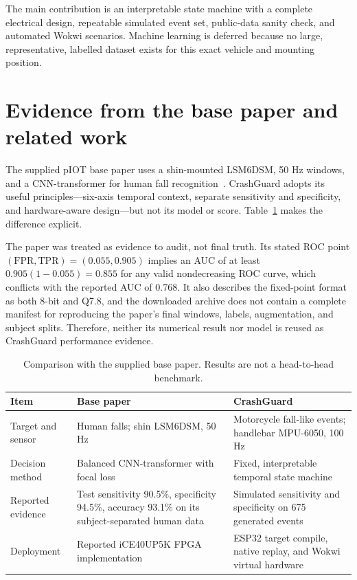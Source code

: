 \documentclass[12pt,a4paper]{article}
\begin{document}
The main contribution is an interpretable state machine with a complete
electrical design, repeatable simulated event set, public-data sanity check,
and automated Wokwi scenarios. Machine learning is deferred because no large,
representative, labelled dataset exists for this exact vehicle and mounting
position.

\section{Evidence from the base paper and related work}

The supplied pIOT base paper uses a shin-mounted LSM6DSM, 50 Hz windows, and a
CNN-transformer for human fall recognition~\cite{tian2026transformer}.
CrashGuard adopts its useful principles---six-axis temporal context, separate
sensitivity and specificity, and hardware-aware design---but not its model or
score. Table~\ref{tab:basecompare} makes the difference explicit.

The paper was treated as evidence to audit, not final truth. Its stated ROC
point $(\mathrm{FPR},\mathrm{TPR})=(0.055,0.905)$ implies an AUC of at least
$0.905(1-0.055)=0.855$ for any valid nondecreasing ROC curve, which conflicts
with the reported AUC of 0.768. It also describes the fixed-point format as
both 8-bit and Q7.8, and the downloaded archive does not contain a complete
manifest for reproducing the paper's final windows, labels, augmentation, and
subject splits. Therefore, neither its numerical result nor model is reused
as CrashGuard performance evidence.

\begin{table}[H]
\centering
\footnotesize
\caption{Comparison with the supplied base paper. Results are not a head-to-head benchmark.}
\label{tab:basecompare}
\begin{tabularx}{\textwidth}{@{}p{}XX@{}}
\toprule
Item & Base paper & CrashGuard \\
\midrule
Target and sensor & Human falls; shin LSM6DSM, 50 Hz & Motorcycle fall-like
events; handlebar MPU-6050, 100 Hz \\
Decision method & Balanced CNN-transformer with focal loss & Fixed,
interpretable temporal state machine \\
Reported evidence & Test sensitivity 90.5\%, specificity 94.5\%, accuracy
93.1\% on its subject-separated human data & Simulated sensitivity
\CrashGuardSensitivity{} and specificity \CrashGuardSpecificity{} on 675
generated events \\
Deployment & Reported iCE40UP5K FPGA implementation & ESP32 target compile,
native replay, and Wokwi virtual hardware \\
\bottomrule
\end{tabularx}
\end{table}
\end{document}
